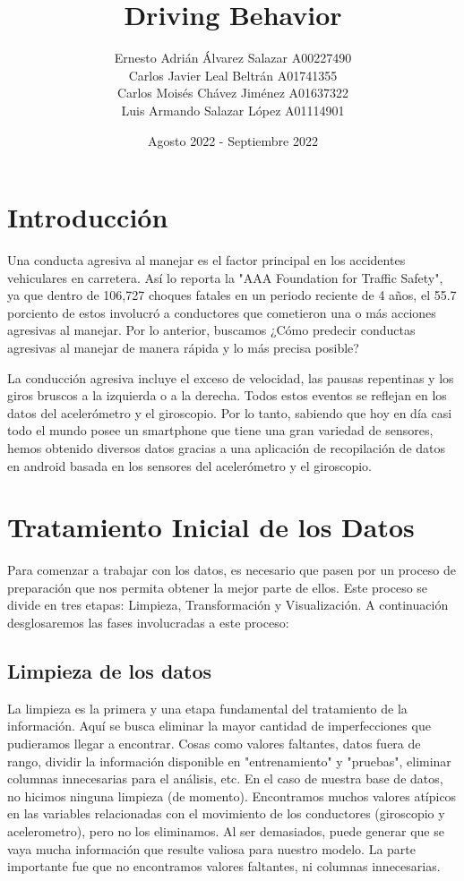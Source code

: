 \documentclass{article}
\title{Driving Behavior}
\author{
Ernesto Adrián Álvarez Salazar  A00227490\\
Carlos Javier Leal Beltrán  A01741355\\
Carlos Moisés Chávez Jiménez  A01637322\\
Luis Armando Salazar López  A01114901\\
}
\date{Agosto 2022 - Septiembre 2022}
\begin{document}
\maketitle

\section{Introducción}
Una conducta agresiva al manejar es el factor principal en los accidentes vehiculares en carretera. Así lo reporta la "AAA Foundation for Traffic Safety", ya que dentro de 106,727 choques fatales en un periodo reciente de 4 años, el 55.7 porciento de estos involucró a conductores que cometieron una o más acciones agresivas al manejar. Por lo anterior, buscamos ¿Cómo predecir conductas agresivas al manejar de manera rápida y lo más precisa posible?

La conducción agresiva incluye el exceso de velocidad, las pausas repentinas y los giros bruscos a la izquierda o a la derecha. Todos estos eventos se reflejan en los datos del acelerómetro y el giroscopio. Por lo tanto, sabiendo que hoy en día casi todo el mundo posee un smartphone que tiene una gran variedad de sensores, hemos obtenido diversos datos gracias a una aplicación de recopilación de datos en android basada en los sensores del acelerómetro y el giroscopio.


\section{Tratamiento Inicial de los Datos}

Para comenzar a trabajar con los datos, es necesario que pasen por un proceso de preparación que nos permita obtener la mejor parte de ellos. Este proceso se divide en tres etapas: Limpieza, Transformación y Visualización. A continuación desglosaremos las fases involucradas a este proceso:

    \subsection{Limpieza de los datos}

        La limpieza es la primera y una etapa fundamental del tratamiento de la información. Aquí se busca eliminar la mayor cantidad de imperfecciones que pudieramos llegar a encontrar. Cosas como valores faltantes, datos fuera de rango, dividir la información disponible en "entrenamiento" y "pruebas", eliminar columnas innecesarias para el análisis, etc.
        En el caso de nuestra base de datos, no hicimos ninguna limpieza (de momento). Encontramos muchos valores atípicos en las variables relacionadas con el movimiento de los conductores (giroscopio y acelerometro), pero no los eliminamos. Al ser demasiados, puede generar que se vaya mucha información que resulte valiosa para nuestro modelo. La parte importante fue que no encontramos valores faltantes, ni columnas innecesarias. \\
\end{document}
